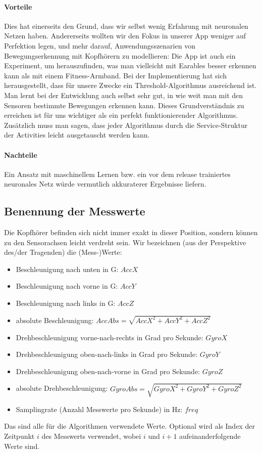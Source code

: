\documentclass[a4paper,12pt]{article}
\begin{document}
\paragraph{Vorteile}
Dies hat einerseits den Grund, dass wir selbst wenig Erfahrung mit neuronalen Netzen haben. Andererseits wollten wir den Fokus in unserer App weniger auf Perfektion legen, und mehr darauf, Anwendungsszenarien von Bewegungserkennung mit Kopfhörern zu modellieren: Die App ist auch ein Experiment, um herauszufinden, was man vielleicht mit Earables besser erkennen kann als mit einem Fitness-Armband. Bei der Implementierung hat sich herausgestellt, dass für unsere Zwecke ein Threshold-Algorithmus ausreichend ist. Man lernt bei der Entwicklung auch selbst sehr gut, in wie weit man mit den Sensoren bestimmte Bewegungen erkennen kann. Dieses Grundverständnis zu erreichen ist für uns wichtiger als ein perfekt funktionierender Algorithmus.\\
Zusätzlich muss man sagen, dass jeder Algorithmus durch die Service-Struktur der Activities leicht ausgetauscht werden kann.
\paragraph{Nachteile}
Ein Ansatz mit maschinellem Lernen bzw. ein vor dem release trainiertes neuronales Netz würde vermutlich akkuraterer Ergebnisse liefern. 
\subsection{Benennung der Messwerte}
Die Kopfhörer befinden sich nicht immer exakt in dieser Position, sondern können zu den Sensorachsen leicht verdreht sein. Wir bezeichnen (aus der Perspektive des/der Tragenden) die (Mess-)Werte:
\begin{itemize}
	\item Beschleunigung nach unten in G: $AccX$
	\item Beschleunigung nach vorne in G: $AccY$
	\item Beschleunigung nach links in G: $AccZ$
	\item absolute Beschleunigung: $AccAbs = \sqrt{AccX^2+AccY^2+AccZ^2}$
	\item Drehbeschleunigung vorne-nach-rechts in Grad pro Sekunde: $GyroX$ 
	\item Drehbeschleunigung oben-nach-links in Grad pro Sekunde: $GyroY$ 
	\item Drehbeschleunigung oben-nach-vorne in Grad pro Sekunde: $GyroZ$ 
	\item absolute Drehbeschleunigung: $GyroAbs = \sqrt{GyroX^2+GyroY^2+GyroZ^2}$
	\item Samplingrate (Anzahl Messwerte pro Sekunde) in Hz: $freq$
\end{itemize}
Das sind alle für die Algorithmen verwendete Werte. Optional wird als Index der Zeitpunkt $i$ des Messwerts verwendet, wobei $i$ und $i+1$ aufeinanderfolgende Werte sind.
\end{document}
